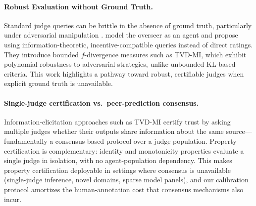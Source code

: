 \documentclass{article}
\begin{document}
\paragraph{Robust Evaluation without Ground Truth.}
Standard judge queries can be brittle in the absence of ground truth, particularly under adversarial manipulation \citep{Zhuo2024ICEScore,TongZhang2024CodeJudge}. \citet{robertson2025stepbystep} model the overseer as an agent and propose using information-theoretic, incentive-compatible queries instead of direct ratings. They introduce bounded $f$-divergence measures such as TVD-MI, which exhibit polynomial robustness to adversarial strategies, unlike unbounded KL-based criteria. This work highlights a pathway toward robust, certifiable judges when explicit ground truth is unavailable.

\paragraph{Single-judge certification vs.\ peer-prediction consensus.}
Information-elicitation approaches such as TVD-MI \citep{robertson2025stepbystep} certify trust by asking multiple judges whether their outputs share information about the same source---fundamentally a consensus-based protocol over a judge population.
Property certification is complementary: identity and monotonicity properties evaluate a single judge in isolation, with no agent-population dependency.
This makes property certification deployable in settings where consensus is unavailable (single-judge inference, novel domains, sparse model panels), and our calibration protocol amortizes the human-annotation cost that consensus mechanisms also incur.
\end{document}
